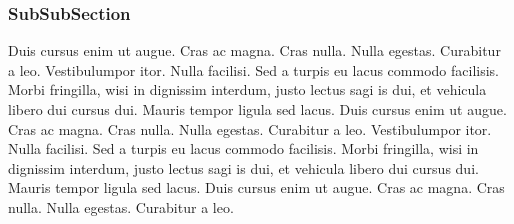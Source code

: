 \documentclass[letterpaper,12pt,oneside]{utexas-dissertation}
\begin{document}
\subsubsection{SubSubSection}
Duis cursus enim ut augue. Cras ac magna. Cras nulla. Nulla egestas. Curabitur a leo. 
Vestibulumpor itor. Nulla facilisi. Sed a turpis eu lacus commodo facilisis. Morbi fringilla, wisi in dignissim interdum, justo lectus sagi is dui, et vehicula libero dui cursus dui. Mauris tempor ligula sed lacus. Duis cursus enim ut augue. Cras ac magna. Cras nulla. Nulla egestas. Curabitur a leo.  
Vestibulumpor itor. Nulla facilisi. Sed a turpis eu lacus commodo facilisis. Morbi fringilla, wisi in dignissim interdum, justo lectus sagi is dui, et vehicula libero dui cursus dui. Mauris tempor ligula sed lacus. Duis cursus enim ut augue. Cras ac magna. Cras nulla. Nulla egestas. Curabitur a leo.   

\backmatter
\end{document}
